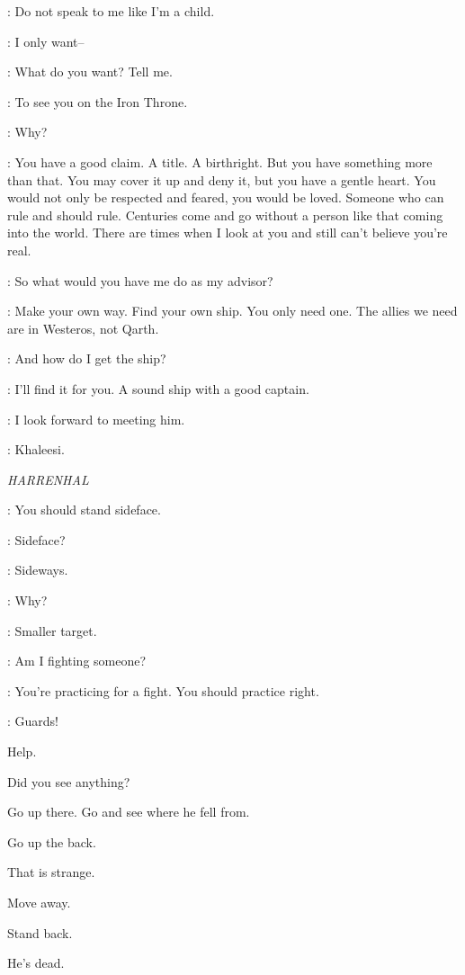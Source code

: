\DAENERYS: Do not speak to me like I'm a child. 

\JORAH: I only want-- 

\DAENERYS: What do you want? Tell me. 

\JORAH: To see you on the Iron Throne. 

\DAENERYS: Why? 

\JORAH: You have a good claim. A title. A birthright. But you have something more than that. You may cover it up and deny it, but you have a gentle heart. You would not only be respected and feared, you would be loved. Someone who can rule and should rule. Centuries come and go without a person like that coming into the world. There are times when I look at you and still can't believe you're real. 

\DAENERYS: So what would you have me do as my advisor? 

\JORAH: Make your own way. Find your own ship. You only need one. The allies we need are in Westeros, not Qarth. 

\DAENERYS: And how do I get the ship? 

\JORAH: I'll find it for you. A sound ship with a good captain. 

\DAENERYS: I look forward to meeting him. 

\JORAH: Khaleesi. 



\scene

\textit{HARRENHAL} 


\ARYA: You should stand sideface. 

\GENDRY: Sideface? 

\ARYA: Sideways. 

\GENDRY: Why? 

\ARYA: Smaller target. 

\GENDRY: Am I fighting someone? 

\ARYA: You're practicing for a fight. You should practice right. 


\VOICES: Guards! 

Help. 

Did you see anything? 

Go up there. Go and see where he fell from. 

Go up the back. 

That is strange. 

Move away. 

Stand back. 

He's dead. 


